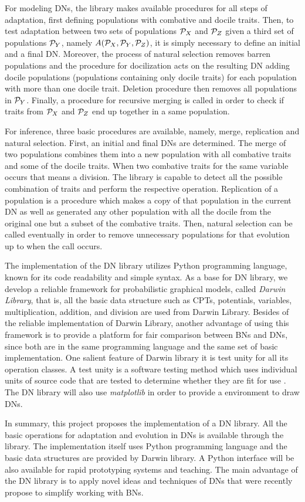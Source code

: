 For modeling DNs, the library makes available procedures for all steps of adaptation, first defining populations with combative and docile traits.
Then, to test adaptation between two sets of populations ${\cal P}_X$ and ${\cal P}_Z$ given a third set of populations ${\cal P}_Y$, namely $A({\cal P}_X, {\cal P}_Y, {\cal P}_Z)$, it is simply necessary to define an initial and a final DN.
Moreover, the process of natural selection removes barren populations and the procedure for docilization acts on the resulting DN adding docile populations (populations containing only docile traits) for each population with more than one docile trait.
Deletion procedure then removes all populations in ${\cal P}_Y$.
Finally, a procedure for recursive merging is called in order to check if traits from ${\cal P}_X$ and ${\cal P}_Z$ end up together in a same population.

For inference, three basic procedures are available, namely, merge, replication and natural selection.
First, an initial and final DNs are determined.
The merge of two populations combines them into a new population with all combative traits and some of the docile traits.
When two combative traits for the same variable occurs that means a division.
The library is capable to detect all the possible combination of traits and perform the respective operation.
Replication of a population is a procedure which makes a copy of that population in the current DN as well as generated any other population with all the docile from the original one but a subset of the combative traits.
Then, natural selection can be called eventually in order to remove unnecessary populations for that evolution up to when the call occurs.

The implementation of the DN library utilizes Python programming language, known for its code readability and simple syntax.
As a base for DN library, we develop a reliable framework for probabilistic graphical models, called \emph{Darwin Library}, that is, all the basic data structure such as CPTs, potentials, variables, multiplication, addition, and division are used from Darwin Library.
Besides of the reliable implementation of Darwin Library, another advantage of using this framework is to provide a platform for fair comparison between BNs and DNs, since both are in the same programming language and the same set of basic implementation.
One salient feature of Darwin library it is test unity for all its operation classes.
A test unity is a software testing method which uses individual units of source code that are tested to determine whether they are fit for use \cite{kolawa2007automated}.
The DN library will also use \emph{matplotlib} \cite{Hunter:2007} in order to provide a environment to draw DNs.

In summary, this project proposes the implementation of a DN library.
All the basic operations for adaptation and evolution in DNs is available through the library.
The implementation itself uses Python programming language and the basic data structures are provided by Darwin library.
A Python interface will be also available for rapid prototyping systems and teaching.
The main advantage of the DN library is to apply novel ideas and techniques of DNs that were recently propose to simplify working with BNs.

